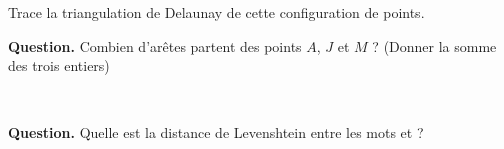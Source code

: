 \documentclass[class=report,crop=false, 12pt]{standalone}
\begin{document}
\begin{enigme}[Triangulation]

Trace la triangulation de Delaunay de cette configuration de points.



\bigskip

\textbf{Question.} Combien d'arêtes partent des points $A$, $J$ et $M$ ? (Donner la somme des trois entiers)

%
%
%

\end{enigme}



\begin{enigme}
  
  ~
  
\bigskip

\textbf{Question.} Quelle est la distance de Levenshtein entre les mots
 et  ?


\end{enigme}
\end{document}
